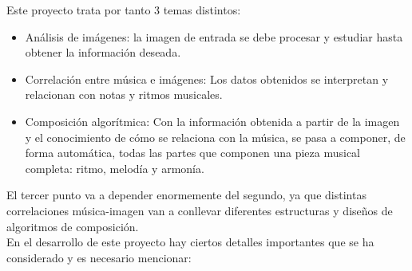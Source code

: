 		Este proyecto trata por tanto 3 temas distintos:
		
		\begin{itemize}
		
		\item Análisis de imágenes: la imagen de entrada se debe procesar y estudiar hasta obtener la información deseada.
		\item Correlación entre música e imágenes: Los datos obtenidos se interpretan y relacionan con notas y ritmos musicales.
		\item Composición algorítmica: Con la información obtenida a partir de la imagen y el conocimiento de cómo se relaciona con la música, se pasa a componer, de forma automática, todas las partes que componen una pieza musical completa: ritmo, melodía y armonía.
		\end{itemize}
		
		El tercer punto va a depender enormemente del segundo, ya que distintas correlaciones música-imagen van a conllevar diferentes estructuras y diseños de algoritmos de composición.\\
		
		En el desarrollo de este proyecto hay ciertos detalles importantes que se ha considerado y es necesario mencionar:	

